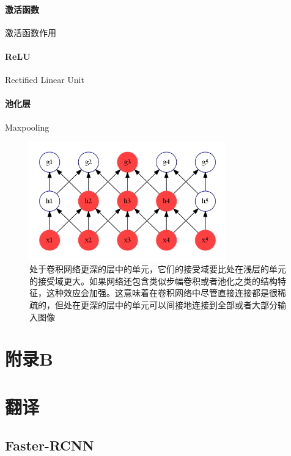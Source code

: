 \documentclass[12pt,a4paper,titlepage]{article}
\begin{document}
\paragraph{激活函数}
激活函数作用

\paragraph{ReLU}
Rectified Linear Unit

\paragraph{池化层}
Maxpooling



\begin{figure}[htbp]

\centering
\includegraphics[width=8.5cm]{img/deep_receptive_field.png}
\caption{处于卷积网络更深的层中的单元，它们的接受域要比处在浅层的单元的接受域更大。如果网络还包含类似步幅卷积或者池化之类的结构特征，这种效应会加强。这意味着在卷积网络中尽管直接连接都是很稀疏的，但处在更深的层中的单元可以间接地连接到全部或者大部分输入图像}
\label{fig:receptive_field}
\end{figure}

\newpage
\section*{附录B}

\section*{翻译}

\subsection*{Faster-RCNN}
\end{document}

